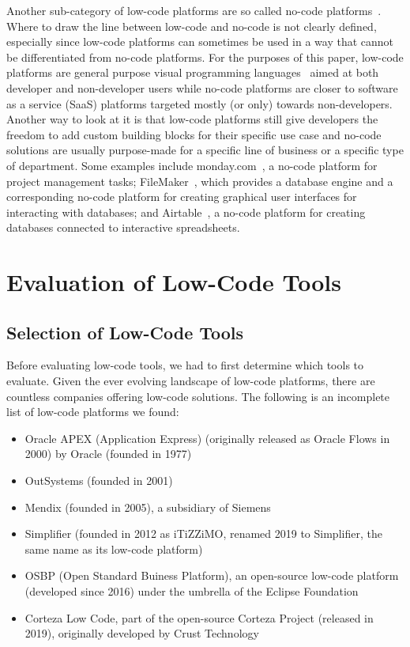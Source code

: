 \documentclass[runningheads]{llncs}
\begin{document}
Another sub-category of low-code platforms are so called no-code platforms~\cite{wiki:no_code_development_platform}. Where to draw the line between low-code and no-code is not clearly defined, especially since low-code platforms can sometimes be used in a way that cannot be differentiated from no-code platforms. For the purposes of this paper, low-code platforms are general purpose visual programming languages~\cite{wiki:visual_programming_language} aimed at both developer and non-developer users while no-code platforms are closer to software as a service (SaaS) platforms targeted mostly (or only) towards non-developers. Another way to look at it is that low-code platforms still give developers the freedom to add custom building blocks for their specific use case and no-code solutions are usually purpose-made for a specific line of business or a specific type of department. Some examples include monday.com~\cite{wiki:monday_com}, a no-code platform for project management tasks; FileMaker~\cite{wiki:filemaker}, which provides a database engine and a corresponding no-code platform for creating graphical user interfaces for interacting with databases; and Airtable~\cite{wiki:airtable}, a no-code platform for creating databases connected to interactive spreadsheets.

\section{Evaluation of Low-Code Tools}
\label{sec:evaluation_of_low_code_tools}

\subsection{Selection of Low-Code Tools}
\label{subsec:choosing_low_code_tools}

Before evaluating low-code tools, we had to first determine which tools to evaluate. Given the ever evolving landscape of low-code platforms, there are countless companies offering low-code solutions. The following is an incomplete list of low-code platforms we found:

\begin{itemize}
  \item Oracle APEX (Application Express) (originally released as Oracle Flows in 2000) by Oracle (founded in 1977)
  \item OutSystems (founded in 2001)
  \item Mendix (founded in 2005), a subsidiary of Siemens
  \item Simplifier (founded in 2012 as iTiZZiMO, renamed 2019 to Simplifier, the same name as its low-code platform)
  \item OSBP (Open Standard Buiness Platform), an open-source low-code platform (developed since 2016) under the umbrella of the Eclipse Foundation
  \item Corteza Low Code, part of the open-source Corteza Project (released in 2019), originally developed by Crust Technology
\end{itemize}
\end{document}
